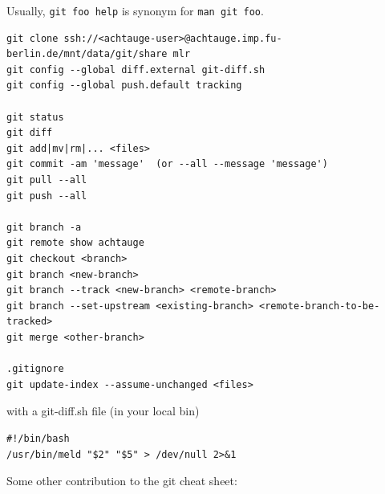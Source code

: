 Usually, \verb+git foo help+ is synonym for \verb+man git foo+.

\begin{code}
\begin{verbatim}
git clone ssh://<achtauge-user>@achtauge.imp.fu-berlin.de/mnt/data/git/share mlr
git config --global diff.external git-diff.sh
git config --global push.default tracking

git status
git diff
git add|mv|rm|... <files>
git commit -am 'message'  (or --all --message 'message')
git pull --all
git push --all

git branch -a
git remote show achtauge
git checkout <branch>
git branch <new-branch>
git branch --track <new-branch> <remote-branch>
git branch --set-upstream <existing-branch> <remote-branch-to-be-tracked>
git merge <other-branch>

.gitignore
git update-index --assume-unchanged <files>
\end{verbatim}
\end{code}

with a git-diff.sh file (in your local bin)
\begin{code}
\begin{verbatim}
#!/bin/bash
/usr/bin/meld "$2" "$5" > /dev/null 2>&1
\end{verbatim}
\end{code}

Some other contribution to the git cheat sheet:


